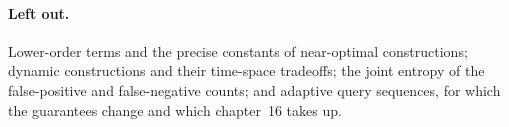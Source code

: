 \paragraph{Left out.}
Lower-order terms and the precise constants of near-optimal constructions;
dynamic constructions and their time-space tradeoffs; the joint entropy of
the false-positive and false-negative counts; and adaptive query sequences,
for which the guarantees change \parencite{bender-et-al-2018} and which
chapter~16 takes up.
